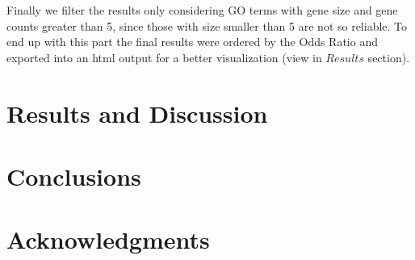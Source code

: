 \documentclass[9pt,twocolumn,twoside]{gsajnl}
\begin{document}
Finally we filter the results only considering GO terms with gene size and gene counts greater than 5, since those with size smaller than 5 are not so reliable. To end up with this part the final results were ordered by the Odds Ratio and exported into an html output for a better visualization (view in $Results$ section).

\section*{Results and Discussion}

\section*{Conclusions}

\section*{Acknowledgments}


\end{document}
